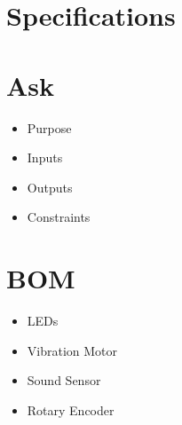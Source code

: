\documentclass{article}
\begin{document}
\section{Specifications}

\section{Ask}
\begin{itemize}
    \item Purpose
    \item Inputs
    \item Outputs
    \item Constraints
  \end{itemize}

\section{BOM}
\begin{itemize}
    \item LEDs
    \item Vibration Motor
    \item Sound Sensor
    \item Rotary Encoder
  \end{itemize}
\end{document}
